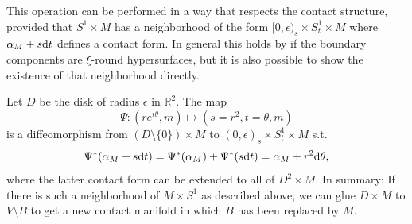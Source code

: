 This operation can be performed in a way that respects the contact structure,
provided that $S^1 \times M$ has a neighborhood
of the form $[0, \epsilon)_s \times S^1_t \times M$ where $\alpha_M + s \mathrm{d} t$
defines a contact form.
In general this holds by \cite[Lemma 5.1]{MNW13} if the boundary components 
are $\xi$-round hypersurfaces, but it is also possible to show the existence 
of that neighborhood directly.

Let $D$ be the disk of radius $\epsilon$ in $\mathbb R^2$. The map 
\[
    \Psi \colon (re^{i\theta} , m) \mapsto (s = r^2, t = \theta, m)
\]
is a diffeomorphism from $(D \setminus \{0\}) \times M$ to 
$(0, \epsilon)_s \times S^1_t \times M$ s.t.
\[
    \Psi^*(\alpha_M + s \mathrm{d} t) = \Psi^*(\alpha_M) + \Psi^*(s\mathrm{d} t) 
    = \alpha_M + r^2 \mathrm{d} \theta,
\]
where the latter contact form can be extended to all of $D^2 \times M$.
In summary: If there is such a neighborhood of $M \times S^1$ as described above, 
we can glue $D \times M$ to $V \setminus B$ to get a new contact manifold 
in which $B$ has been replaced by $M$.

